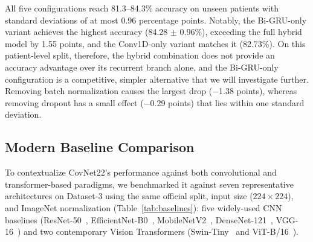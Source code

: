 \documentclass[a4paper,fleqn]{cas-sc}
\begin{document}
All five configurations reach 81.3--84.3\% accuracy on unseen patients with standard deviations of at most 0.96 percentage points. Notably, the Bi-GRU-only variant achieves the highest accuracy (84.28 $\pm$ 0.96\%), exceeding the full hybrid model by 1.55 points, and the Conv1D-only variant matches it (82.73\%). On this patient-level split, therefore, the hybrid combination does not provide an accuracy advantage over its recurrent branch alone, and the Bi-GRU-only configuration is a competitive, simpler alternative that we will investigate further. Removing batch normalization causes the largest drop ($-$1.38 points), whereas removing dropout has a small effect ($-$0.29 points) that lies within one standard deviation.

\subsection{Modern Baseline Comparison}
\label{sec:baselines}

To contextualize CovNet22's performance against both convolutional and transformer-based paradigms, we benchmarked it against seven representative architectures on Dataset-3 using the same official split, input size ($224\times224$), and ImageNet normalization (Table~\ref{tab:baselines}): five widely-used CNN baselines (ResNet-50~\cite{R_He2016}, EfficientNet-B0~\cite{R_Tan2019}, MobileNetV2~\cite{R_Sandler2018}, DenseNet-121~\cite{R_Huang2017}, VGG-16~\cite{R_Simonyan2015}) and two contemporary Vision Transformers (Swin-Tiny~\cite{R_Liu2021} and ViT-B/16~\cite{R_Dosovitskiy2021}).
\end{document}
